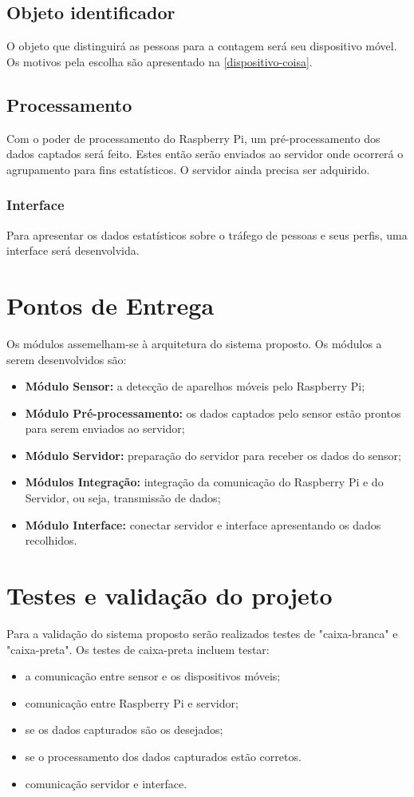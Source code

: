 \subsection{Objeto identificador}
O objeto que distinguirá as pessoas para a contagem será seu dispositivo móvel. Os motivos pela escolha são apresentado na \autoref{dispositivo-coisa}.

\subsection{Processamento}
Com o poder de processamento do Raspberry Pi, um pré-processamento dos dados captados será feito. Estes então serão enviados ao servidor onde
ocorrerá o agrupamento para fins estatísticos. O servidor ainda precisa ser adquirido.

\subsubsection{Interface}
Para apresentar os dados estatísticos sobre o tráfego de pessoas e seus perfis, uma interface será desenvolvida.

\section{Pontos de Entrega}
\label{pontos-entrega}
Os módulos assemelham-se à arquitetura do sistema proposto. Os módulos a serem desenvolvidos são:
\begin{itemize}
  \item \textbf{Módulo Sensor:} a detecção de aparelhos móveis pelo Raspberry Pi;
  \item \textbf{Módulo Pré-processamento:} os dados captados pelo sensor estão prontos para serem enviados ao servidor;
  \item \textbf{Módulo Servidor:} preparação do servidor para receber os dados do sensor;
  \item \textbf{Módulos Integração:} integração da comunicação do Raspberry Pi e do Servidor, ou seja, transmissão de dados;
  \item \textbf{Módulo Interface:} conectar servidor e interface apresentando os dados recolhidos.
\end{itemize}

\section{Testes e validação do projeto}
Para a validação do sistema proposto serão realizados testes de "caixa-branca" e "caixa-preta". Os testes de caixa-preta incluem testar:
\begin{itemize}
  \item a comunicação entre sensor e os dispositivos móveis;
  \item comunicação entre Raspberry Pi e servidor;
  \item se os dados capturados são os desejados;
  \item se o processamento dos dados capturados estão corretos.
  \item comunicação servidor e interface.
\end{itemize}

